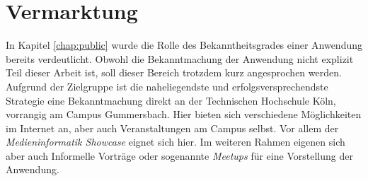 \section{Vermarktung}
In Kapitel \ref{chap:public} wurde die Rolle des Bekanntheitsgrades einer Anwendung bereits verdeutlicht. Obwohl die Bekanntmachung der Anwendung nicht explizit Teil dieser Arbeit ist, soll dieser Bereich trotzdem kurz angesprochen werden.\\
Aufgrund der Zielgruppe ist die naheliegendste und erfolgsversprechendste Strategie eine Bekanntmachung direkt an der Technischen Hochschule Köln, vorrangig am Campus Gummersbach. Hier bieten sich verschiedene Möglichkeiten im Internet an, aber auch Veranstaltungen am Campus selbst. Vor allem der \textit{Medieninformatik Showcase} eignet sich hier.
Im weiteren Rahmen eigenen sich aber auch Informelle Vorträge oder sogenannte \textit{Meetups} für eine Vorstellung der Anwendung.
